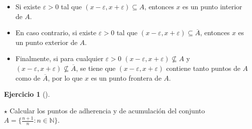 \documentclass[
  a4paper,
]{scrreport}
\providecommand{\tightlist}{%
  \setlength{\itemsep}{0pt}\setlength{\parskip}{0pt}}\usepackage{longtable,booktabs,array}
\theoremstyle{definition}
\newtheorem{exercise}{Ejercicio}[chapter]
\theoremstyle{remark}
\begin{document}
\begin{tcolorbox}
\begin{itemize}
\tightlist
\item
  Si existe \(\varepsilon>0\) tal que
  \((x-\varepsilon, x+\varepsilon)\subseteq A\), entonces \(x\) es un
  punto interior de \(A\).
\item
  En caso contrario, si existe \(\varepsilon>0\) tal que
  \((x-\varepsilon, x+\varepsilon)\subseteq \overline{A}\), entonces
  \(x\) es un punto exterior de \(A\).
\item
  Finalmente, si para cualquier \(\varepsilon>0\)
  \((x-\varepsilon, x+\varepsilon)\not\subseteq A\) y
  \((x-\varepsilon, x+\varepsilon)\not\subseteq \overline{A}\), se tiene
  que \((x-\varepsilon, x+\varepsilon)\) contiene tanto puntos de \(A\)
  como de \(\overline{A}\), por lo que \(x\) es un punto frontera de
  \(A\).
\end{itemize}

\end{tcolorbox}

\begin{exercise}[]\protect\hypertarget{exr-particion-interior-exterior-frontera}{}\label{exr-particion-interior-exterior-frontera}

\(\star\) Calcular los puntos de adherencia y de acumulación del
conjunto \(A=\{\frac{n+1}{n}:n\in\mathbb{N}\}\).

\end{exercise}
\end{document}
